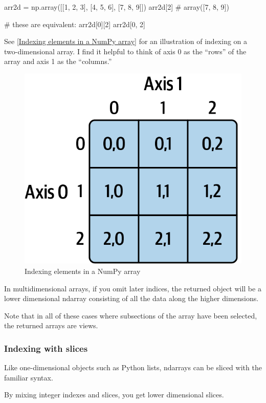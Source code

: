 \begin{pyc}
arr2d = np.array([[1, 2, 3], [4, 5, 6], [7, 8, 9]])
arr2d[2]
# array([7, 8, 9])

# these are equivalent:
arr2d[0][2]
arr2d[0, 2]
\end{pyc}

See \autoref{Indexing elements in a NumPy array} for an illustration of indexing on a two-dimensional array. I find it helpful to think of axis 0 as the “rows” of the array and axis 1 as the “columns.”
\begin{figure}
    \centering
    \includegraphics[width=.5\textwidth]{img/codes/Indexing elements in a NumPy array.png}
    \caption{Indexing elements in a NumPy array}
    \label{Indexing elements in a NumPy array}
\end{figure}

In multidimensional arrays, if you omit later indices, the returned object will be a
lower dimensional ndarray consisting of all the data along the higher dimensions. 

Note that in all of these cases where subsections of the array have been selected, the
returned arrays are views.

\subsubsection{Indexing with slices}
Like one-dimensional objects such as Python lists, ndarrays can be sliced with the
familiar syntax.

By mixing integer indexes and slices, you get lower dimensional slices.

